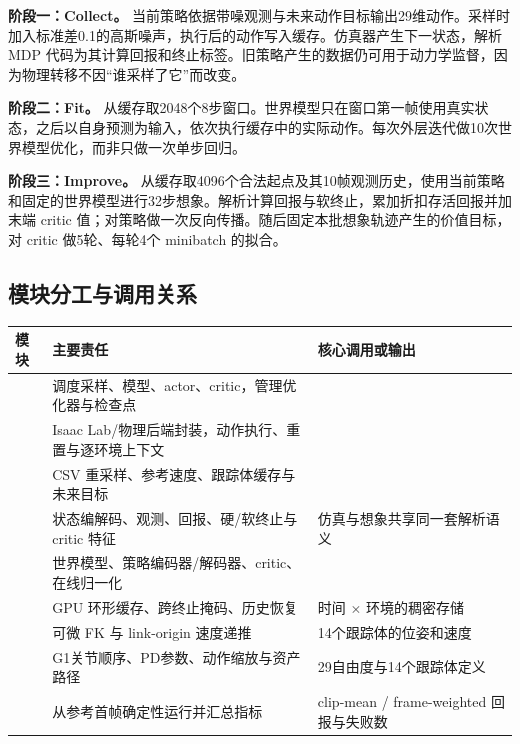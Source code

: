 \textbf{阶段一：Collect。} 当前策略依据带噪观测与未来动作目标输出29维动作。采样时加入标准差0.1的高斯噪声，执行后的动作写入缓存。仿真器产生下一状态，解析 MDP 代码为其计算回报和终止标签。旧策略产生的数据仍可用于动力学监督，因为物理转移不因“谁采样了它”而改变。

\textbf{阶段二：Fit。} 从缓存取2048个8步窗口。世界模型只在窗口第一帧使用真实状态，之后以自身预测为输入，依次执行缓存中的实际动作。每次外层迭代做10次世界模型优化，而非只做一次单步回归。

\textbf{阶段三：Improve。} 从缓存取4096个合法起点及其10帧观测历史，使用当前策略和固定的世界模型进行32步想象。解析计算回报与软终止，累加折扣存活回报并加末端 critic 值；对策略做一次反向传播。随后固定本批想象轨迹产生的价值目标，对 critic 做5轮、每轮4个 minibatch 的拟合。

\subsection{模块分工与调用关系}
\noindent\begin{tabularx}{\textwidth}{@{}P{32mm}Y Y@{}}
\toprule
模块 & 主要责任 & 核心调用或输出\\
\midrule
{} & 调度采样、模型、actor、critic，管理优化器与检查点 & \\
 & Isaac Lab/物理后端封装，动作执行、重置与逐环境上下文 & \\
 & CSV 重采样、参考速度、跟踪体缓存与未来目标 & \\
 & 状态编解码、观测、回报、硬/软终止与 critic 特征 & 仿真与想象共享同一套解析语义\\
 & 世界模型、策略编码器/解码器、critic、在线归一化 & \\
 & GPU 环形缓存、跨终止掩码、历史恢复 & 时间 $\times$ 环境的稠密存储\\
 & 可微 FK 与 link-origin 速度递推 & 14个跟踪体的位姿和速度\\
 & G1关节顺序、PD参数、动作缩放与资产路径 & 29自由度与14个跟踪体定义\\
 & 从参考首帧确定性运行并汇总指标 & clip-mean / frame-weighted 回报与失败数\\
\bottomrule
\end{tabularx}

